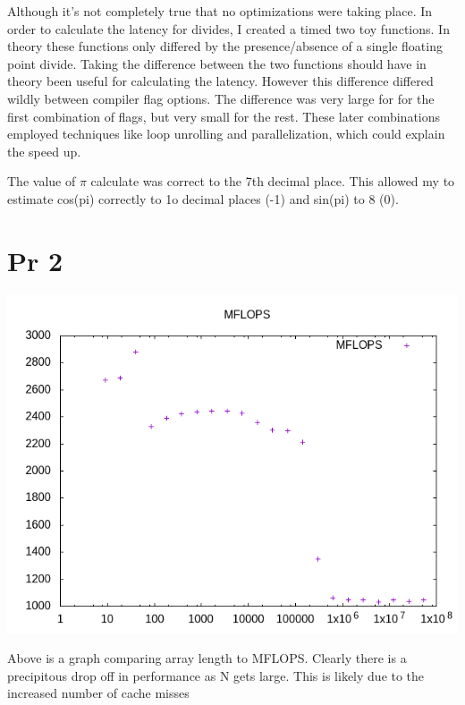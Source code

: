 \documentclass[11pt]{article}
\begin{document}
Although it's not completely true that no optimizations were taking place. In order to calculate the latency for divides, I created a timed two toy functions. In theory these functions only differed by the presence/absence of a single floating point divide. Taking the difference between the two functions should have in theory been useful for calculating the latency. However this difference differed wildly between compiler flag options. The difference was very large for for the first combination of flags, but very small for the rest. These later combinations employed techniques like loop unrolling and parallelization, which could explain the speed up. 

The value of \(\pi\) calculate was correct to the 7th decimal place. This allowed my to estimate cos(pi) correctly to 1o decimal places (-1) and sin(pi) to 8 (0).

\section{Pr 2}
\label{sec:orgee2aac8}

\begin{center}
\includegraphics[width=.9\linewidth]{MFLOPS.png}
\end{center}

Above is a graph comparing array length to MFLOPS. Clearly there is a precipitous drop off in performance as N gets large. This is likely due to the increased number of cache misses 
\end{document}
